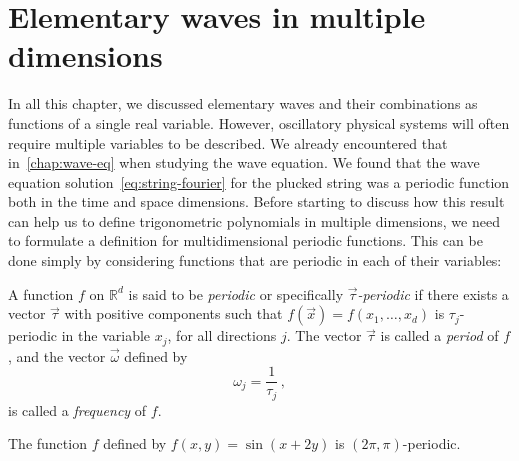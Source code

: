 \section{Elementary waves in multiple dimensions}
In all this chapter, we discussed elementary waves and their combinations as functions of
a single real variable. However, oscillatory physical systems will often require multiple
variables to be described. We already encountered that in~\cref{chap:wave-eq} when
studying the wave equation. We found that the wave equation
solution~\cref{eq:string-fourier} for the plucked string was a periodic function both in
the time and space dimensions. Before starting to discuss how this result can help us to
define trigonometric polynomials in multiple dimensions, we need to formulate a definition
for multidimensional periodic functions. This can be done simply by considering functions
that are periodic in each of their variables:
\begin{definition}
  A function $f$ on $\mathbb{R}^d$ is said to be \emph{periodic} or specifically
  \emph{$\vec{\tau}$-periodic} if there exists a vector $\vec{\tau}$ with positive
  components such that $f(\vec{x})=f(x_1,\dots,x_d)$ is $\tau_j$-periodic in the variable
  $x_j$, for all directions $j$. The vector $\vec{\tau}$ is called a \emph{period} of $f$,
  and the vector $\vec{\omega}$ defined by
  \begin{equation}
    \omega_j=\frac{1}{\tau_j}\,,
  \end{equation}
  is called a \emph{frequency} of $f$.
\end{definition}
\begin{example}
  The function $f$ defined by $f(x,y)=\sin(x+2y)$ is $(2\pi,\pi)$-periodic.
\end{example}

